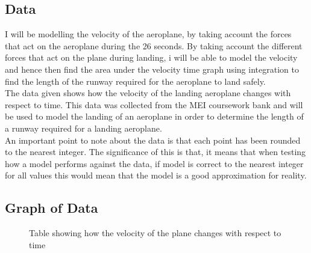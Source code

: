 \subsection{Data}
I will be modelling the velocity of the aeroplane, by taking account the forces that act on the aeroplane during the 26 seconds. By taking account the different forces that act on the plane during landing, i will be able to model the velocity and hence then find the area under the velocity time graph using integration to find the length of the runway required for the aeroplane to land safely.
\\
The data given shows how the velocity of the landing aeroplane changes with respect to time.  This data was collected from the MEI coursework bank and will be used to model the landing of an aeroplane in order to determine the length of a runway required for a landing aeroplane.
\\
An important point to note about the data is that each point has been rounded to the nearest integer. The significance of this is that, it means that when testing how a model performs against the data, if model is correct to the nearest integer for all values this would mean that the model is a good approximation for reality. 

\subsection{Graph of Data}

\begin{figure}[h]
\centering
{}
\caption{Table showing how the velocity of the plane changes with respect to time}
\end{figure}

